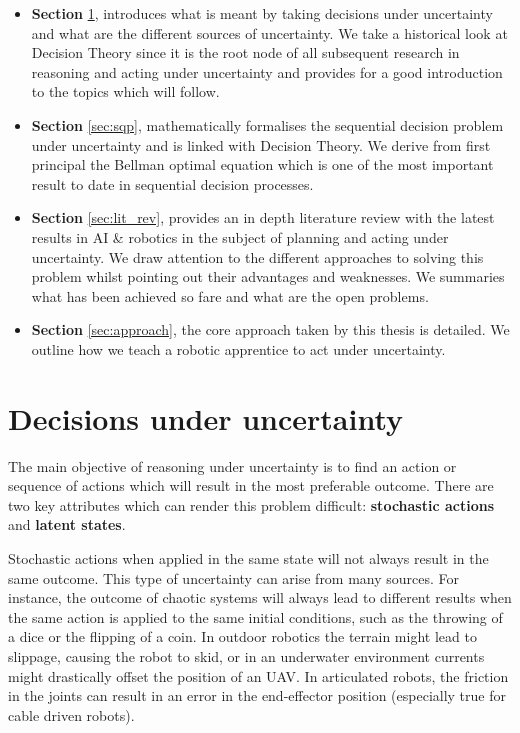 \begin{itemize}
 \item \textbf{Section} \ref{sec:deci_un}, introduces what is meant by taking decisions under uncertainty and what are the different 
 sources of uncertainty. We take a historical look at Decision Theory since it is the root node of all subsequent research in reasoning 
 and acting under uncertainty and provides for a good introduction to the topics which will follow.  
 \item \textbf{Section} \ref{sec:sqp},  mathematically formalises the sequential decision problem under uncertainty and is linked with Decision Theory. We derive from first principal 
 the Bellman optimal equation which is one of the most important result to date in sequential decision processes.
 \item \textbf{Section} \ref{sec:lit_rev}, provides an in depth literature review with the latest results in AI \& robotics in the subject 
of planning and acting under uncertainty. We draw attention to the different approaches to solving this problem whilst pointing out
their advantages and weaknesses. We summaries what has been achieved so fare and what are the open problems.
 \item \textbf{Section} \ref{sec:approach}, the core approach taken by this thesis is detailed. We outline how we teach a robotic apprentice 
 to act under uncertainty.
\end{itemize}



\section{Decisions under uncertainty}\label{sec:deci_un}

The main objective of reasoning under uncertainty is to find an action or sequence of
actions which will result in the most preferable outcome. There are two key attributes which can render this 
problem difficult: \textbf{stochastic actions} and \textbf{latent states}. 

Stochastic actions when applied in the same state will not always result in the same outcome. This type of uncertainty 
can arise from many sources. For instance, the outcome of chaotic systems will always lead to different results when the same action is applied
to the same initial conditions, such as the throwing of a dice or the flipping of a coin. In outdoor robotics the terrain might lead to slippage, causing 
the robot to skid, or in an underwater environment currents might drastically offset the position of an UAV. In articulated robots, the friction in the joints 
can result in an error in the end-effector position (especially true for cable driven robots).

